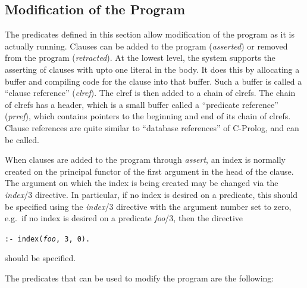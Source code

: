 \subsection{Modification of the Program}

The predicates defined in this section allow modification of the program
as it is actually running.
Clauses can be added to the program ({\em asserted})
or removed from the program ({\em retracted}).
At the lowest level, the system supports the asserting of clauses with upto
one literal in the body.
It does this by allocating a buffer and compiling code for the clause into
that buffer.
Such a buffer is called a ``clause reference'' ({\em clref}).
The clref is then added to a chain of clrefs.
The chain of clrefs has a header,
which is a small buffer called a ``predicate reference'' ({\em prref}),
which contains pointers to the beginning and end of its chain of clrefs.
Clause references are quite similar to ``database references'' of C-Prolog,
and can be called.

When clauses are added to the program through {\em assert},
an index is normally created on the principal functor of the first argument
in the head of the clause.
The argument on which the index is being created may be changed via the
{\em index}/3 directive.
In particular, if no index is desired on a predicate,
this should be specified using the {\em index}/3
directive with the argument number set to zero,
e.g.\ if no index is desired on a predicate {\em foo}/3, then the directive
\begin{center}
{\tt :- index({\em foo}, 3, 0).}
\end{center}
should be specified.

The predicates that can be used to modify the program are the following:

